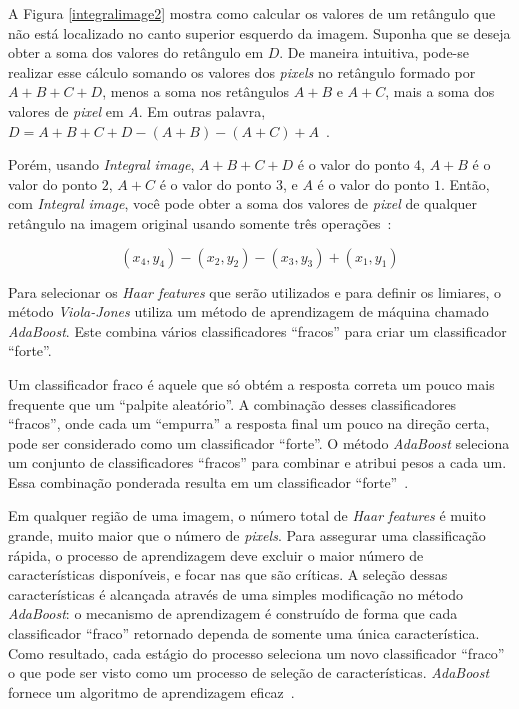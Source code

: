 A Figura \ref{integralimage2} mostra como calcular os valores de um retângulo que não está localizado no canto superior esquerdo da imagem. Suponha que se deseja obter a soma dos valores do retângulo em $\displaystyle D$. De maneira intuitiva, pode-se realizar esse cálculo somando os valores dos \textit{pixels} no retângulo formado por $\displaystyle A+B+C+D$, menos a soma nos retângulos $\displaystyle A+B$ e $\displaystyle A+C$, mais a soma dos valores de \textit{pixel} em $\displaystyle A$. Em outras palavra, $\displaystyle D = A+B+C+D-(A+B)-(A+C)+A$~\cite{servodetection, violajones}.

Porém, usando \textit{Integral image}, $\displaystyle A+B+C+D$ é o valor do ponto $\displaystyle 4$, $\displaystyle A+B$ é o valor do ponto $\displaystyle 2$, $\displaystyle A+C$ é o valor do ponto $\displaystyle 3$, e $\displaystyle A$ é o valor do ponto $\displaystyle 1$. Então, com \textit{Integral image}, você pode obter a soma dos valores de \textit{pixel} de qualquer retângulo na imagem original usando somente três operações~\cite{servodetection, violajones}:

	\begin{equation}
		(x_4,y_4) - (x_2,y_2) - (x_3,y_3) + (x_1,y_1)
		\label{equacaointegralimage}
	\end{equation} 

Para selecionar os \textit{Haar features} que serão utilizados e para definir os limiares, o método \textit{Viola-Jones} utiliza um método de aprendizagem de máquina chamado \textit{AdaBoost}. Este combina vários classificadores ``fracos'' para criar um classificador ``forte''. 

Um classificador fraco é aquele que só obtém a resposta correta um pouco mais frequente que um ``palpite aleatório''. A combinação desses classificadores ``fracos'', onde cada um ``empurra'' a resposta final um pouco na direção certa, pode ser considerado como um classificador ``forte''. O método \textit{AdaBoost} seleciona um conjunto de classificadores ``fracos'' para combinar e atribui pesos a cada um. Essa combinação ponderada resulta em um classificador ``forte''~\cite{servodetection}.

Em qualquer região de uma imagem, o número total de \textit{Haar features} é muito grande, muito maior que o número de \textit{pixels}. Para assegurar uma classificação rápida, o processo de aprendizagem deve excluir o maior número de características disponíveis, e focar nas que são críticas. A seleção dessas características é alcançada através de uma simples modificação no método \textit{AdaBoost}: o mecanismo de aprendizagem é construído de forma que cada classificador ``fraco'' retornado dependa de somente uma única característica. Como resultado, cada estágio do processo seleciona um novo classificador ``fraco'' o que pode ser visto como um processo de seleção de características. \textit{AdaBoost} fornece um algoritmo de aprendizagem eficaz~\cite{violajones}.

